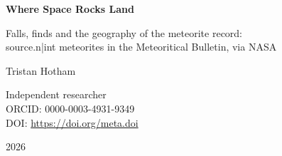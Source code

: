 \documentclass[11pt,a4paper]{article}
\begin{document}
\begin{center}
{\Large\bfseries Where Space Rocks Land\par}
\vspace{0.4em}
{\large Falls, finds and the geography of the meteorite record:\\{{source.n|int}} meteorites in the Meteoritical Bulletin, via NASA\par}
\vspace{1.2em}
{\large Tristan Hotham\par}
\vspace{0.3em}
{\small Independent researcher\\
ORCID: 0000-0003-4931-9349\\
DOI: \href{https://doi.org/{{meta.doi}}}{https://doi.org/{{meta.doi}}}\par}
\vspace{0.8em}
2026
\end{center}
\end{document}
